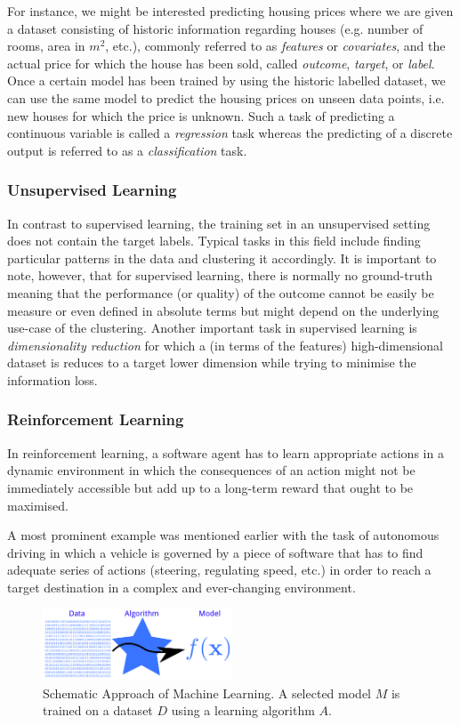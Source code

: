 For instance, we might be interested predicting housing prices where we are given a dataset consisting of historic information regarding houses (e.g. number of rooms, area in $m^2$, etc.), commonly referred  to as \emph{features} or \emph{covariates}, and the actual price for which the house has been sold, called \emph{outcome}, \emph{target}, or \emph{label}. Once a certain model has been trained by using the historic labelled dataset, we can use the same model to predict the housing prices on unseen data points, i.e. new houses for which the price is unknown. Such a task of predicting a continuous variable is called a \emph{regression} task whereas the predicting of a discrete output is referred to as a \emph{classification} task. 

\subsubsection{Unsupervised Learning} 
In contrast to supervised learning, the training set in an unsupervised setting does not contain the target labels. Typical tasks in this field include finding particular patterns in the data and clustering it accordingly. It is important to note, however, that for supervised learning, there is normally no ground-truth meaning that the performance (or quality) of the outcome cannot be easily be measure or even defined in absolute terms but might depend on the underlying use-case of the clustering. Another important task in supervised learning is \emph{dimensionality reduction} for which a (in terms of the features) high-dimensional dataset is reduces to a target lower dimension while trying to minimise the information loss. 

\subsubsection{Reinforcement Learning}
In reinforcement learning, a software agent has to learn appropriate actions in a dynamic environment in which the consequences of an action might not be immediately accessible but add up to a long-term reward that ought to be maximised. 

A most prominent example was mentioned earlier with the task of autonomous driving in which a vehicle is governed by a piece of software that has to find adequate series of actions (steering, regulating speed, etc.) in order to reach a target destination in a complex and ever-changing environment. 


\begin{figure}[]
	\caption{Schematic Approach of Machine Learning. A selected model $M$ is trained on a dataset $D$ using a learning algorithm $A$.} \label{fig:machine-learning-approach}
	\centering
	\includegraphics[width=0.5\textwidth]{figures/chapter-2/machine-learning-approach.png}
\end{figure}

